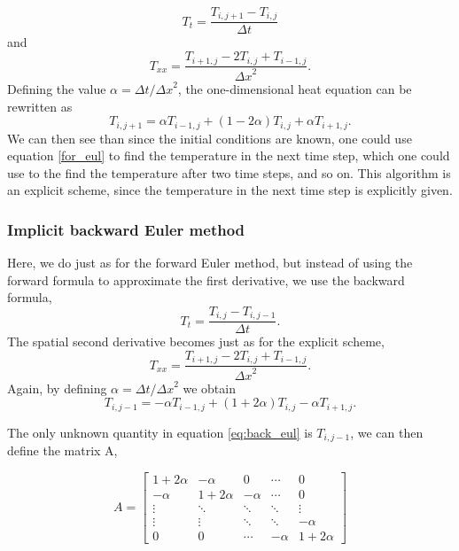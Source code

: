 \documentclass{article}
\begin{document}
\begin{multicols}{2}
\begin{equation}
	T_t=\frac{T_{i,j+1}-T_{i,j}}{\Delta t}
\end{equation}
and
\begin{equation}
	T_{xx}=\frac{T_{i+1,j}-2T_{i,j}+ T_{i-1,j}}{{\Delta x}^2}.
\end{equation}
Defining the value $\alpha = \Delta t/ {\Delta x}^2 $, the one-dimensional heat equation can be rewritten as
\begin{equation}
	T_{i,j+1}=\alpha T_{i-1,j}+(1-2\alpha )T_{i,j} + \alpha T_{i+1, j}. \label{for_eul}
\end{equation}
We can then see than since the initial conditions are known, one could use equation \eqref{for_eul} to find the temperature in the next time step, which one could use to the find the temperature after two time steps, and so on. This algorithm is an explicit scheme, since the temperature in the next time step is explicitly given. 

\subsubsection{Implicit backward Euler method}

Here, we do just as for the forward Euler method, but instead of using the forward formula to approximate the first derivative, we use the backward formula,
\begin{equation}
T_t=\frac{T_{i,j}-T_{i,j-1}}{\Delta t}.
\end{equation}
The spatial second derivative becomes just as for the explicit scheme, 
\begin{equation}
T_{xx}=\frac{T_{i+1,j}-2T_{i,j}+ T_{i-1,j}}{{\Delta x}^2}.
\end{equation}
Again, by defining $\alpha = \Delta t/ {\Delta x}^2$ we obtain
\begin{equation}
T_{i,j-1}=-\alpha T_{i-1,j}+(1+2\alpha )T_{i,j} - \alpha T_{i+1, j}. \label{eq:back_eul}
\end{equation}

The only unknown quantity in equation \ref{eq:back_eul} is $T_{i,j-1}$, we can then define the matrix A,

\begin{equation}
A = 
\begin{bmatrix}
1+2\alpha & -\alpha & 0 & \cdots & 0 \\
-\alpha & 1+2\alpha & -\alpha & \cdots & 0  \\
\vdots  & \ddots  & \ddots & \ddots & \vdots  \\
\vdots  & \vdots  & \ddots & \ddots & -\alpha  \\
0 & 0 & \cdots & -\alpha & 1+2\alpha
\end{bmatrix}
\end{equation}


\end{multicols}
\end{document}
